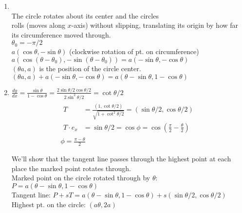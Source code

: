 \documentclass[twoside]{amsart}
\theoremstyle{plain}
\theoremstyle{definition}
\newcommand{\exercisehead}[1]
  {\smallskip
   \noindent{\small\bf Exercise #1.}}
\begin{document}
\exercisehead{20}
\begin{enumerate}
\item \quad \\
  The circle rotates about its center and the circles \\
  \phantom{ The circle } rolls (moves along $x$-axis) without slipping, translating its origin by how far its circumference moved through.  \\

$\theta_0 = -\pi/2$ \smallskip \\
  $a (\cos{\theta},-\sin{\theta})$ \quad (clockwise rotation of pt. on circumference) \\
  $a(\cos{(\theta - \theta_0)}, - \sin{ (\theta- \theta_0) }) = a (-\sin{\theta},-\cos{\theta})$ \\
  $(\theta a,a)$ is the position of the circle center.  \bigskip \\
  $(\theta a,a) + a (-\sin{\theta}, -\cos{\theta}) = \boxed{ a (\theta - \sin{\theta}, 1 - \cos{\theta} ) }$
\item $\frac{dy}{dx} = \frac{\sin{\theta} }{ 1 - \cos{\theta} } = \frac{ 2 \sin{ \theta/2} \cos{\theta/2}}{ 2 \sin^2{ \theta/2} } = \boxed{ \cot{\theta/2} }$ 
\[
\begin{gathered}
  \begin{aligned}
    T & = \frac{ (1,\cot{\theta/2})}{ \sqrt{ 1 + \cot^2{\theta/2}}} = (\sin{\theta/2}, \cos{\theta/2}) \\
    T\cdot e_x & = \sin{\theta/2} = \cos{ \phi} = \cos{ \left( \frac{\pi}{2} - \frac{ \theta}{2} \right)} 
  \end{aligned} \\
  \boxed{ \phi = \frac{ \pi - \theta}{2} }
\end{gathered}
\]

We'll show that the tangent line passes through the highest point at each place the marked point rotates through.  \smallskip \\
Marked point on the circle rotated through by $\theta$: $P = a (\theta- \sin{\theta}, 1 - \cos{\theta} )$ \\
Tangent line: $P + sT = a(\theta-\sin{\theta},1 - \cos{\theta}) + s (\sin{\theta/2},\cos{\theta/2})$ \\
Highest pt. on the circle: $(a\theta, 2a)$ \\


\end{enumerate}
\end{document}
